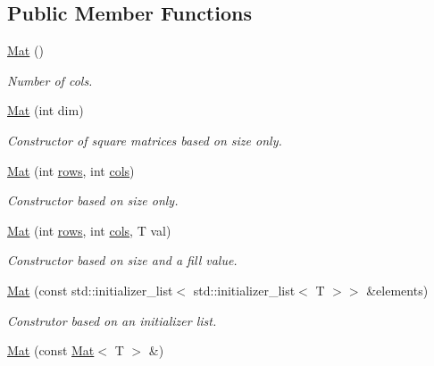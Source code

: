 \subsection*{Public Member Functions}
\begin{DoxyCompactItemize}
\item 
\mbox{\label{classtao_1_1_mat_a92faf4e75c90d8431fd6f60ef5e33b4a}} 
\mbox{\hyperlink{classtao_1_1_mat_a92faf4e75c90d8431fd6f60ef5e33b4a}{Mat}} ()
\begin{DoxyCompactList}\small\item\em Number of cols. \end{DoxyCompactList}\item 
\mbox{\hyperlink{classtao_1_1_mat_a22ea16d2a3e3a1da5eb7de57e5bf02c2}{Mat}} (int dim)
\begin{DoxyCompactList}\small\item\em Constructor of square matrices based on size only. \end{DoxyCompactList}\item 
\mbox{\hyperlink{classtao_1_1_mat_a8b2f68a1f5539462e6f4186bc5f8a5c7}{Mat}} (int \mbox{\hyperlink{classtao_1_1_mat_adba65952e3b69680bd1d9f6477c20d7d}{rows}}, int \mbox{\hyperlink{classtao_1_1_mat_a80e80ef1ee80e33719d9637153186ee4}{cols}})
\begin{DoxyCompactList}\small\item\em Constructor based on size only. \end{DoxyCompactList}\item 
\mbox{\hyperlink{classtao_1_1_mat_a83589751aea3dcecc363068fd540a930}{Mat}} (int \mbox{\hyperlink{classtao_1_1_mat_adba65952e3b69680bd1d9f6477c20d7d}{rows}}, int \mbox{\hyperlink{classtao_1_1_mat_a80e80ef1ee80e33719d9637153186ee4}{cols}}, T val)
\begin{DoxyCompactList}\small\item\em Constructor based on size and a fill value. \end{DoxyCompactList}\item 
\mbox{\hyperlink{classtao_1_1_mat_a2c26859cc4b8bf40eb26dd4335f2d3c0}{Mat}} (const std\+::initializer\+\_\+list$<$ std\+::initializer\+\_\+list$<$ T $>$$>$ \&elements)
\begin{DoxyCompactList}\small\item\em Construtor based on an initializer list. \end{DoxyCompactList}\item 
\mbox{\hyperlink{classtao_1_1_mat_a74c591cbc3893506d9f97cf9f54e7adf}{Mat}} (const \mbox{\hyperlink{classtao_1_1_mat}{Mat}}$<$ T $>$ \&)
$$
\end{DoxyCompactItemize}
